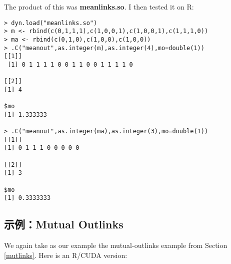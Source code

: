 The product of this was {\bf meanlinks.so}.  I then tested it on R:

\begin{lstlisting}
> dyn.load("meanlinks.so")
> m <- rbind(c(0,1,1,1),c(1,0,0,1),c(1,0,0,1),c(1,1,1,0))
> ma <- rbind(c(0,1,0),c(1,0,0),c(1,0,0))
> .C("meanout",as.integer(m),as.integer(4),mo=double(1))
[[1]]
 [1] 0 1 1 1 1 0 0 1 1 0 0 1 1 1 1 0

[[2]]
[1] 4

$mo
[1] 1.333333

> .C("meanout",as.integer(ma),as.integer(3),mo=double(1))
[[1]]
[1] 0 1 1 1 0 0 0 0 0

[[2]]
[1] 3

$mo
[1] 0.3333333
\end{lstlisting}

\subsection{示例：Mutual Outlinks}

We again take as our example the mutual-outlinks example from Section
\ref{mutlinks}.  Here is an R/CUDA version:


